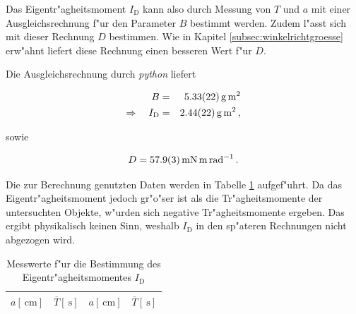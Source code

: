 		Das Eigentr"agheitsmoment $I_\mathrm{D}$ kann also durch Messung von $T$ und $a$ mit einer Ausgleichsrechnung f"ur den Parameter $B$ bestimmt werden.
		Zudem l"asst sich mit dieser Rechnung $D$ bestimmen.
		Wie in Kapitel \ref{subsec:winkelrichtgroesse} erw"ahnt liefert diese Rechnung einen besseren Wert f"ur $D$.

		Die Ausgleichsrechnung durch \emph{python} liefert

		\begin{eqnarray*}
			B & = & \SI{5.33 (22)}{\gram \meter \squared} \\
			\Rightarrow \quad I_\mathrm{D} & = & \SI{2.44 (22)}{\gram \meter \squared} \,,
		\end{eqnarray*}

		sowie

		\begin{equation*}
			D = \SI{57.9 (3)}{\milli \newton \meter \per \radian} \,.
		\end{equation*}

		Die zur Berechnung genutzten Daten werden in Tabelle \ref{tabelle:eigentraegheitsmoment} aufgef"uhrt.
		Da das Eigentr"agheitsmoment jedoch gr"o"ser ist als die Tr"agheitsmomente der untersuchten Objekte, w"urden sich negative Tr"agheitsmomente ergeben.
		Das ergibt physikalisch keinen Sinn, weshalb $I_\mathrm{D}$ in den sp"ateren Rechnungen nicht abgezogen wird.

		\begin{table}[h!]
			\begin{center}
				\caption{Messwerte f"ur die Bestimmung des Eigentr"agheitsmomentes $I_\mathrm{D}$ \label{tabelle:eigentraegheitsmoment}}
				\begin{tabular}{|c|c||c|c|}
					\hline
					$a [\SI{}{\centi \meter}]$ & $\overline{T} [\SI{}{\second}]$ & $a [\SI{}{\centi \meter}]$ & $\overline{T} [\SI{}{\second}]$\\
					\hline 
					\hline
					
					\hline 
				\end{tabular}
			\end{center}
		\end{table}

		\clearpage

